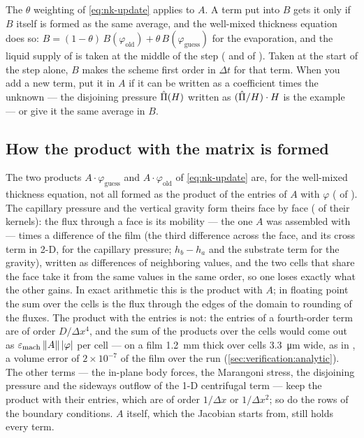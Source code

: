 \begin{warn}
  The $\theta$ weighting of \cref{eq:nk-update} applies to $A$. A term put into
  $B$ gets it only if $B$ itself is formed as the same average, and the
  well-mixed thickness equation does so: $B = (1-\theta)\,B(\varphi_{\mathrm{old}})
  + \theta\,B(\varphi_{\mathrm{guess}})$ for the evaporation, and the liquid
  supply of  is taken at the middle of the step
  ( and  of
  ). Taken at the start of the step alone, $B$
  makes the scheme first order in $\Delta t$ for that term. When you add a new term, put it in $A$
  if it can be written as a coefficient times the unknown --- the disjoining
  pressure $\hat{\Pi}(H)$ written as $(\hat{\Pi}/H)\cdot H$ is the example --- or
  give it the same average in $B$.
\end{warn}

\subsection{How the product with the matrix is formed}
\label{sec:time:apply}

The two products $A\cdot\varphi_{\mathrm{guess}}$ and
$A\cdot\varphi_{\mathrm{old}}$ of \cref{eq:nk-update} are, for the well-mixed
thickness equation, not all formed as the product of the entries of $A$ with
$\varphi$ ( of ). The capillary
pressure and the vertical gravity form theirs face by face
( of their kernels): the flux through a face is its
mobility --- the one $A$ was assembled with --- times a difference of the film
(the third difference across the face, and its cross term in 2-D, for the
capillary pressure; $h_b - h_a$ and the substrate term for the gravity),
written as differences of neighboring values, and the two cells that share
the face take it from the same values in the same order, so one loses exactly
what the other gains. In exact arithmetic this is the product with $A$; in
floating point the sum over the cells is the flux through the edges of the
domain to rounding of the fluxes. The product with the entries is not: the
entries of a fourth-order term are of order $D/\Delta x^{4}$, and the sum of
the products over the cells would come out as
$\varepsilon_{\mathrm{mach}}\,\lVert A\rVert\,\lvert\varphi\rvert$ per cell --- on a film
\SI{1.2}{\milli\metre} thick over cells \SI{3.3}{\micro\metre} wide, as in
, a volume error of $2\times10^{-7}$ of the film
over the run (\cref{sec:verification:analytic}). The other terms --- the in-plane body
forces, the Marangoni stress, the disjoining pressure and the sideways
outflow of the 1-D centrifugal term --- keep the product with their entries,
which are of order $1/\Delta x$ or $1/\Delta x^{2}$; so do the rows of the
boundary conditions. $A$ itself, which the Jacobian starts from, still holds
every term.

